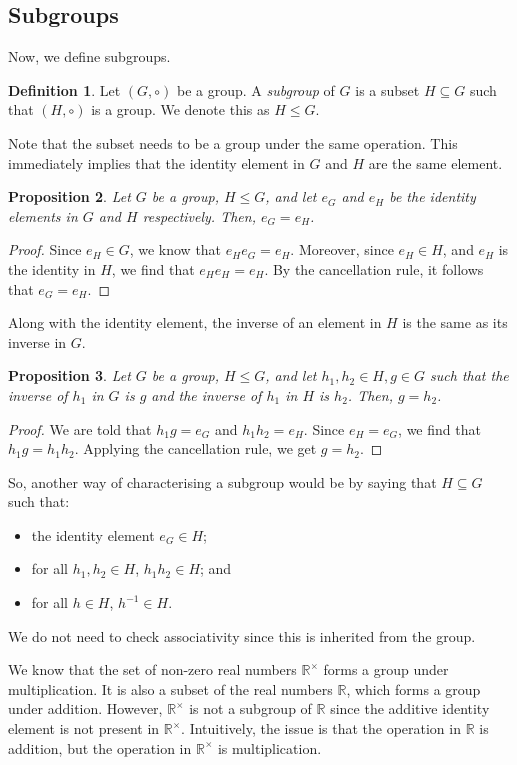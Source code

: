\documentclass[a4paper, openany]{memoir}
\theoremstyle{definition}
\newtheorem{definition}{Definition}[section]
\theoremstyle{plain}
\newtheorem{proposition}[definition]{Proposition}
\begin{document}
\subsection{Subgroups}
Now, we define subgroups.
\begin{definition}
Let $(G, \circ)$ be a group. A \emph{subgroup} of $G$ is a subset $H \subseteq G$ such that $(H, \circ)$ is a group. We denote this as $H \leqslant G$.
\end{definition}
Note that the subset needs to be a group under the same operation. This immediately implies that the identity element in $G$ and $H$ are the same element.
\begin{proposition}
Let $G$ be a group, $H \leqslant G$, and let $e_G$ and $e_H$ be the identity elements in $G$ and $H$ respectively. Then, $e_G = e_H$.
\end{proposition}
\begin{proof}
Since $e_H \in G$, we know that $e_H e_G = e_H$. Moreover, since $e_H \in H$, and $e_H$ is the identity in $H$, we find that $e_H e_H = e_H$. By the cancellation rule, it follows that $e_G = e_H$.
\end{proof}
\noindent Along with the identity element, the inverse of an element in $H$ is the same as its inverse in $G$.
\begin{proposition}
Let $G$ be a group, $H \leqslant G$, and let $h_1, h_2 \in H, g \in G$ such that the inverse of $h_1$ in $G$ is $g$ and the inverse of $h_1$ in $H$ is $h_2$. Then, $g = h_2$.
\end{proposition}
\begin{proof}
We are told that $h_1g = e_G$ and $h_1h_2 = e_H$. Since $e_H = e_G$, we find that $h_1g = h_1h_2$. Applying the cancellation rule, we get $g = h_2$.
\end{proof}
\noindent So, another way of characterising a subgroup would be by saying that $H \subseteq G$ such that:
\begin{itemize}
    \item the identity element $e_G \in H$;
    \item for all $h_1, h_2 \in H$, $h_1h_2 \in H$; and
    \item for all $h \in H$, $h^{-1} \in H$.
\end{itemize}
We do not need to check associativity since this is inherited from the group.

We know that the set of non-zero real numbers $\mathbb{R}^\times$ forms a group under multiplication. It is also a subset of the real numbers $\mathbb{R}$, which forms a group under addition. However, $\mathbb{R}^\times$ is not a subgroup of $\mathbb{R}$ since the additive identity element is not present in $\mathbb{R}^\times$. Intuitively, the issue is that the operation in $\mathbb{R}$ is addition, but the operation in $\mathbb{R}^\times$ is multiplication.
\end{document}
